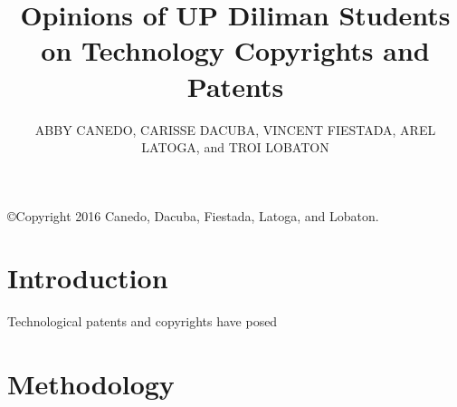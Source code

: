 \documentclass[prodmode,cs196]{acmlarge}
\title{Opinions of UP Diliman Students on Technology Copyrights and Patents}
\author{ABBY CANEDO, CARISSE DACUBA, VINCENT FIESTADA, AREL LATOGA, and TROI LOBATON \affil{University of the Philippines Diliman}}
\begin{document}
\begin{bottomstuff}
\copyright Copyright 2016 Canedo, Dacuba, Fiestada, Latoga, and Lobaton.
\end{bottomstuff}


\maketitle

\section{Introduction}

Technological patents and copyrights have posed 

\section{Methodology}
\end{document}

